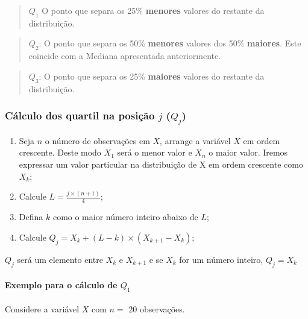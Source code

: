 \documentclass[
]{book}
\begin{document}
\begin{quote}
\(Q_{1}\) O ponto que separa os 25\% \textbf{menores} valores do restante da distribuição.
\end{quote}

\begin{quote}
\(Q_{2}\): O ponto que separa os 50\% \textbf{menores} valores dos 50\% \textbf{maiores}. Este coincide com a Mediana apresentada anteriormente.
\end{quote}

\begin{quote}
\(Q_{3}\): O ponto que separa os 25\% \textbf{maiores} valores do restante da distribuição.
\end{quote}

\hypertarget{cuxe1lculo-dos-quartil-na-posiuxe7uxe3o-j-q_j}{%
\subsubsection{\texorpdfstring{Cálculo dos quartil na posição \(j\) (\(Q_j\))}{Cálculo dos quartil na posição j (Q\_j)}}\label{cuxe1lculo-dos-quartil-na-posiuxe7uxe3o-j-q_j}}

\begin{enumerate}
\def\labelenumi{\arabic{enumi}.}
\item
  Seja \(n\) o número de observações em \(X\), arrange a variável \(X\) em ordem crescente. Deste modo \(X_1\) será o menor valor e \(X_n\) o maior valor. Iremos expressar um valor particular na distribuição de X em ordem crescente como \(X_k\);
\item
  Calcule \(L = \frac{j \times (n+1)}{4}\);
\item
  Defina \(k\) como o maior número inteiro abaixo de \(L\);
\item
  Calcule \(Q_j = X_k + (L - k) \times (X_{k+1}-X_k)\);
\end{enumerate}

\(Q_j\) será um elemento entre \(X_k\) e \(X_{k+1}\) e se \(X_k\) for um número inteiro, \(Q_j = X_k\)

\hypertarget{exemplo-para-o-cuxe1lculo-de-q_1}{%
\paragraph{\texorpdfstring{Exemplo para o cálculo de \(Q_1\)}{Exemplo para o cálculo de Q\_1}}\label{exemplo-para-o-cuxe1lculo-de-q_1}}

Considere a variável \(X\) com \(n =\) 20 observações.
\end{document}

